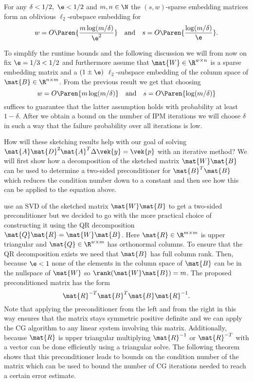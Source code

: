 \begin{theorem}\label{thm:sparse-ose}
For any \(\delta < 1/2, \ \e < 1/2\) and \(m, n \in \N\) the \((s, w)\)-sparse embedding matrices form an oblivious \(\ell_2\)-subspace embedding for
\[ w = O \Paren{\frac{m \log(m/\delta)}{\e^2}} \quad \text{and} \quad s = O \Paren{\frac{\log(m/\delta)}{\e}}. \]
\end{theorem}

To simplify the runtime bounds and the following discussion we will from now on fix \(\e = 1/3 < 1/2\) and furthermore assume that \(\mat{W} \in \R^{w \times n}\) is a sparse embedding matrix and a \((1\pm\e)\) \(\ell_2\)-subspace embedding of the column space of \(\mat{B} \in \R^{n \times m}\).
From the previous result we get that choosing
\begin{equation} \label{eqn:sparse-ose-params}
  w = O \Paren{m \log(m/\delta)} \quad \text{and} \quad s = O \Paren{\log(m/\delta)}
\end{equation}
suffices to guarantee that the latter assumption holds with probability at least \(1 - \delta\).
After we obtain a bound on the number of IPM iterations we will choose \(\delta\) in such a way that the failure probability over all iterations is low.

How will these sketching results help with our goal of solving \(\mat{A} \mat{D}^2 \mat{A}^T \Delta\vek{y} = \vek{p}\) with an iterative method?
We will first show how a decomposition of the sketched matrix \(\mat{W}\mat{B}\) can be used to determine a two-sided preconditioner for \(\mat{B}^T \mat{B}\) which reduces the condition number down to a constant and then see how this can be applied to the equation above.

\Textcite{Avron-FasterRandomizedInfeasibleIPMs} use an SVD of the sketched matrix \(\mat{W}\mat{B}\) to get a two-sided preconditioner but we decided to go with the more practical choice of constructing it using the QR decomposition \(\mat{Q}\mat{R} = \mat{W}\mat{B}\).
Here \(\mat{R} \in \R^{m \times m}\) is upper triangular and \(\mat{Q} \in \R^{w \times m}\) has orthonormal columns.
To ensure that the QR decomposition exists we need that \(\mat{B}\) has full column rank. Then, because \(\e < 1\) none of the elements in the column space of \(\mat{B}\) can be in the nullspace of \(\mat{W}\) so \(\rank(\mat{W}\mat{B}) = m\).
The proposed preconditioned matrix has the form
\begin{equation}\label{eqn:preconditioned-matrix}
 \mat{R}^{-T} \mat{B}^T \mat{B} \mat{R}^{-1}.
\end{equation}
Note that applying the preconditioner from the left and from the right in this way ensures that the matrix stays symmetric positive definite and we can apply the CG algorithm to any linear system involving this matrix.
Additionally, because \(\mat{R}\) is upper triangular multiplying \(\mat{R}^{-1}\) or \(\mat{R}^{-T}\) with a vector can be done efficiently using a triangular solve.
The following theorem shows that this preconditioner leads to bounds on the condition number of the matrix which can be used to bound the number of CG iterations needed to reach a certain error estimate.

